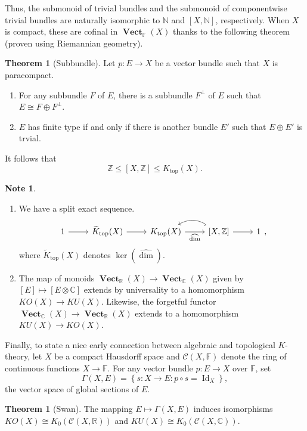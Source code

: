 \documentclass[10pt,letterpaper,cm]{nupset}
\theoremstyle{definition}
\newtheorem{note}[definition]{Note}
\theoremstyle{theorem}
\newtheorem{theorem}[definition]{Theorem}
\theoremstyle{remark}
\newcommand{\C}{\mathbb C}
\newcommand{\F}{\mathbb F}
\newcommand{\N}{\mathbb N}
\newcommand{\R}{\mathbb R}
\newcommand{\Z}{\mathbb Z}
\newcommand{\1}{\mathbf{1}}
\newcommand{\0}{\vec 0}
\DeclareMathOperator{\id}{Id}
\DeclareMathOperator{\vect}{\mathbf{Vect}}
\DeclareMathOperator{\topp}{\mathrm{top}}
\begin{document}
Thus, the submonoid  of trivial bundles and the submonoid of componentwise trivial bundles are naturally isomorphic to $\N$ and $\left[X, \N\right]$, respectively.  When $X$ is compact, these are cofinal in $\vect_{\F}(X)$ thanks to the following theorem (proven using Riemannian geometry). 

\begin{theorem}[Subbundle]
Let $p: E \to X$ be a vector bundle such that $X$ is paracompact.
\begin{enumerate}[label=(\alph*)]
\item For any subbundle $F$ of $E$, there is a subbundle $F^{\perp}$ of $E$ such that $E \cong F \oplus F^{\perp}$.
\item $E$ has finite type if and only if there is another bundle $E'$ such that $E\oplus E'$ is trvial.
\end{enumerate}
\end{theorem}

It follows that $$\Z \leq \left[X, \Z\right] \leq K_{\topp}(X).$$

\medskip

\begin{note} $ $
\begin{enumerate}
\item We have a split exact sequence. 
\[
\begin{tikzcd}
1 \arrow[r] & \widetilde{K}_{\topp}(X) \arrow[r] & K_{\topp}(X) \arrow[r, "\widehat{\dim}"'] & {[X, \mathbb Z]} \arrow[r] \arrow[l, hook, bend right] & 1
\end{tikzcd},
\] where $\widetilde{K}_{\topp}(X)$ denotes $\ker\left(\widehat{\dim}\right)$.
\item The map of monoids $\vect_{\R}(X) \to \vect_{\C}(X)$ given by $\left[E\right] \mapsto \left[E \otimes \C\right]$ extends by universality to a homomorphism $KO(X) \to KU(X)$. Likewise, the forgetful functor $\vect_{\C}(X) \to \vect_{\R}(X)$ extends to a homomorphism $KU(X) \to KO(X)$.
\end{enumerate}
\end{note}

\medskip

Finally, to state a nice early connection between algebraic and topological $K$-theory, let $X$ be a compact Hausdorff space and $\mathcal C(X, \F)$ denote the ring of continuous functions $X \to \F$. For any vector bundle $p: E \to X$ over $\F$, set $$\Gamma(X, E) = \left\{s: X \to E : p \circ s = \id_X\right\},$$ the vector space of global sections of $E$.

\begin{theorem}[Swan]\label{swan}
The mapping $E \mapsto \Gamma(X, E)$ induces isomorphisms $KO(X) \cong K_0(\mathcal C(X, \R))$ and $KU(X) \cong K_0( \mathcal C(X, \C))$.
\end{theorem}
\end{document}

